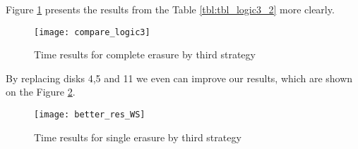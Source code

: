 \newpage
Figure \ref{fig:compare_logic3} presents the results from the Table \ref{tbl:tbl_logic3_2} more clearly.
\begin{figure}[h!]
\begin{center}
  \texttt{[image: compare\_logic3]}
\end{center}
  \caption{Time results for complete erasure by third strategy}
  \label{fig:compare_logic3}
\end{figure}

By replacing disks 4,5 and 11 we even can improve our results, which are shown on the Figure \ref{fig:better_res_WS}.
\begin{figure}[h!]
\begin{center}
  \texttt{[image: better\_res\_WS]}
\end{center}
  \caption{Time results for single erasure by third strategy}
  \label{fig:better_res_WS}
\end{figure}




\newpage
